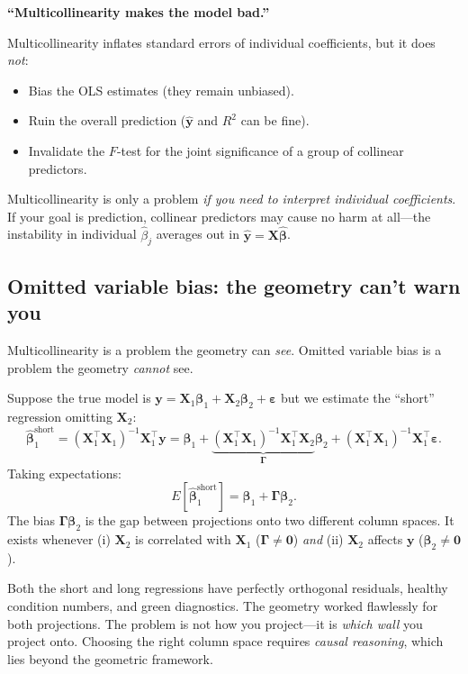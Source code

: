 \documentclass[11pt,a4paper]{article}
\theoremstyle{plain}
\theoremstyle{definition}
\newcommand{\yhat}{\hat{\bm{y}}}
\newcommand{\bhat}{\hat{\bm{\beta}}}
\newcommand{\bX}{\bm{X}}
\newcommand{\by}{\bm{y}}
\begin{document}
\begin{misconception}
\textbf{``Multicollinearity makes the model bad.''}

Multicollinearity inflates standard errors of individual coefficients,
but it does \emph{not}:
\begin{itemize}[nosep]
  \item Bias the OLS estimates (they remain unbiased).
  \item Ruin the overall prediction ($\yhat$ and $R^2$ can be fine).
  \item Invalidate the $F$-test for the joint significance of a group
        of collinear predictors.
\end{itemize}
Multicollinearity is only a problem \emph{if you need to interpret
individual coefficients}.
If your goal is prediction, collinear predictors may cause no harm
at all---the instability in individual $\hat{\beta}_j$ averages out in
$\yhat = \bX\bhat$.
\end{misconception}

\subsection{Omitted variable bias: the geometry can't warn you}

\begin{warning}
Multicollinearity is a problem the geometry can \emph{see}.
Omitted variable bias is a problem the geometry \emph{cannot} see.
\end{warning}

Suppose the true model is
$\by = \bX_1\bm{\beta}_1 + \bX_2\bm{\beta}_2 + \bm{\varepsilon}$
but we estimate the ``short'' regression omitting $\bX_2$:
\[
  \bhat_1^{\text{short}}
  = (\bX_1^\top\bX_1)^{-1}\bX_1^\top\by
  = \bm{\beta}_1 + \underbrace{(\bX_1^\top\bX_1)^{-1}\bX_1^\top\bX_2}_{\bm{\Gamma}}\bm{\beta}_2
    + (\bX_1^\top\bX_1)^{-1}\bX_1^\top\bm{\varepsilon}.
\]
Taking expectations:
\begin{equation}\label{eq:ovb}
  \boxed{
  E[\bhat_1^{\text{short}}] = \bm{\beta}_1 + \bm{\Gamma}\bm{\beta}_2.
  }
\end{equation}
The bias $\bm{\Gamma}\bm{\beta}_2$ is the gap between projections onto
two different column spaces.
It exists whenever (i) $\bX_2$ is correlated with $\bX_1$
($\bm{\Gamma}\ne\bm{0}$) \emph{and} (ii) $\bX_2$ affects $\by$
($\bm{\beta}_2\ne\bm{0}$).

Both the short and long regressions have perfectly orthogonal residuals,
healthy condition numbers, and green diagnostics.
The geometry worked flawlessly for both projections.
The problem is not how you project---it is \emph{which wall} you
project onto.
Choosing the right column space requires \emph{causal reasoning},
which lies beyond the geometric framework.
\end{document}
